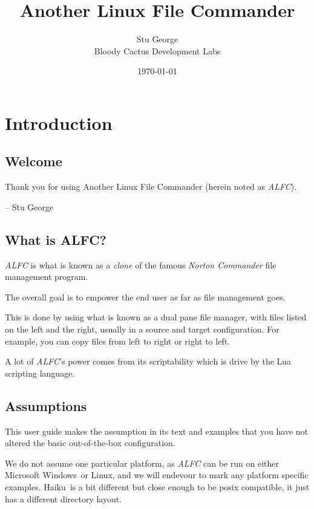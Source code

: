 \documentclass[letterpaper]{article}
\def\xbe{Haiku}
\def\xlin{Linux}
\def\xmswin{Microsoft Windows}
\def\xapp{Another Linux File Commander}
\def\xauthor{Stu George}
\def\xdeveloper{Bloody Cactus Development Labs}
\begin{document}
\title{\xapp}
\author{\xauthor\\\xdeveloper}
\date{\today}
\maketitle


\vfill \eject

\tableofcontents

\vfill \eject
\setlength{\parskip}{3mm}
\section{Introduction}
\subsection{Welcome}
Thank you for using Another Linux File Commander (herein noted as \textsl{ALFC}).

\begin{flushright}
-- \xauthor
\end{flushright}

\vfill \eject
\subsection{What is ALFC?}
\textsl{ALFC} is what is known as a \textsl{clone} of the famous \textsl{Norton Commander} 
file management program.

The overall goal is to empower the end user as far as file management goes.

This is done by using what is known as a dual pane file manager, with files listed on the left
and the right, usually in a source and target configuration. For example, you can copy files from left to right or right to left.

A lot of \textsl{ALFC}'s power comes from its scriptability which is drive by the Lua scripting language.

\subsection{Assumptions}
This user guide makes the assumption in its text and examples that you have not altered the
basic out-of-the-box configuration.

We do not assume one particular platform, as \textsl{ALFC} can be run on either \xmswin\ or \xlin, and we will endevour to mark any platform specific examples. \xbe\ is a bit different but close enough to be posix compatible, it just has a different directory layout.
\end{document}
